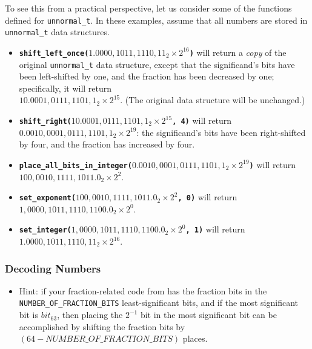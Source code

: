 To see this from a practical perspective, let us consider some of the functions defined for \lstinline{unnormal_t}.
In these examples, assume that all numbers are stored in \lstinline{unnormal_t} data structures.
\begin{itemize}
    \item \textbf{\texttt{shift\_left\_once($1.0000,1011,1110,11_{2} \times 2^{16}$)}} will return a \textit{copy} of the original \lstinline{unnormal_t} data structure, except that the significand's bits have been left-shifted by one, and the fraction has been decreased by one;
        specifically, it will return \\ $10.0001,0111,1101,1_{2} \times 2^{15}$.
        (The original data structure will be unchanged.)
    \item \textbf{\texttt{shift\_right($10.0001,0111,1101,1_{2} \times 2^{15}$, 4)}} will return \\
        $0.0010,0001,0111,1101,1_{2} \times 2^{19}$: the significand's bits have been right-shifted by four, and the fraction has increased by four.
    \item \textbf{\texttt{place\_all\_bits\_in\_integer($0.0010,0001,0111,1101,1_{2} \times 2^{19}$)}} will return \\
        $100,0010,1111,1011.0_{2} \times 2^{2}$.
    \item \textbf{\texttt{set\_exponent($100,0010,1111,1011.0_{2} \times 2^{2}$, 0)}} will return  \\
        $1,0000,1011,1110,1100.0_{2} \times 2^{0}$.
    \item \textbf{\texttt{set\_integer($1,0000,1011,1110,1100.0_{2} \times 2^{0}$, 1)}} will return  \\
        $1.0000,1011,1110,11_{2} \times 2^{16}$.
\end{itemize}


\subsubsection{Decoding Numbers}

\begin{description}
    \begin{itemize}
        \item Hint: if your fraction-related code from  has the fraction bits in the \lstinline{NUMBER_OF_FRACTION_BITS} least-significant bits,
            and if the most significant bit is $bit_{63}$, then placing the $2^{-1}$ bit in the most significant bit can be accomplished by shifting the fraction bits by $(64 - NUMBER\_OF\_FRACTION\_BITS)$ places.
    \end{itemize}
\end{description}


